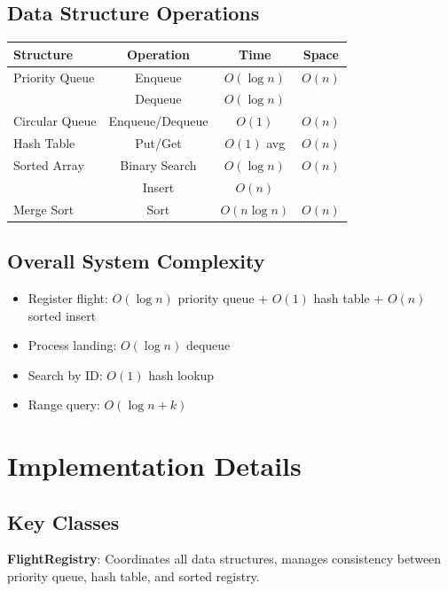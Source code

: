 \documentclass[12pt,a4paper]{article}
\begin{document}
\subsection{Data Structure Operations}

\begin{table}[h]
\centering
\begin{tabular}{l|c|c|c}
\textbf{Structure} & \textbf{Operation} & \textbf{Time} & \textbf{Space} \\
\hline
Priority Queue & Enqueue & $O(\log n)$ & $O(n)$ \\
 & Dequeue & $O(\log n)$ & \\
Circular Queue & Enqueue/Dequeue & $O(1)$ & $O(n)$ \\
Hash Table & Put/Get & $O(1)$ avg & $O(n)$ \\
Sorted Array & Binary Search & $O(\log n)$ & $O(n)$ \\
 & Insert & $O(n)$ & \\
Merge Sort & Sort & $O(n \log n)$ & $O(n)$ \\
\end{tabular}
\end{table}

\subsection{Overall System Complexity}

\begin{itemize}
    \item Register flight: $O(\log n)$ priority queue + $O(1)$ hash table + $O(n)$ sorted insert
    \item Process landing: $O(\log n)$ dequeue
    \item Search by ID: $O(1)$ hash lookup
    \item Range query: $O(\log n + k)$
\end{itemize}

\section{Implementation Details}

\subsection{Key Classes}

\textbf{FlightRegistry}: Coordinates all data structures, manages consistency between priority queue, hash table, and sorted registry.
\end{document}
